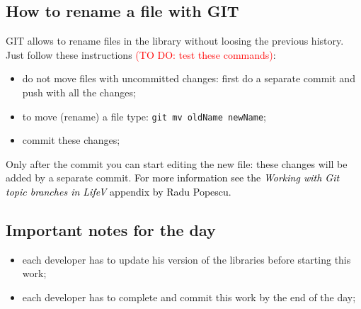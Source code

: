 \documentclass[10p]{article}
\newcommand{\todo}[1]{\textcolor{red}{#1}}
\newcommand{\newpartsVC}[1]{\textcolor{black}{#1}}
\theoremstyle{definition}
\begin{document}

\subsection*{How to rename a file with GIT}
GIT allows to rename files in the library without loosing the previous history. Just follow these instructions \todo{(TO DO: test these commands)}:
\begin{itemize}
  \item do not move files with uncommitted changes: first do a separate commit and push with all the changes;
  \item to move (rename) a file type: \texttt{git mv oldName newName};
  \item commit these changes;
\end{itemize}
Only after the commit you can start editing the new file: these changes will be added by a separate commit. \newpartsVC{For more information see the \emph{Working with Git topic branches in LifeV} appendix by Radu Popescu.}

\subsection*{Important notes for the day}
\begin{itemize}
  \item each developer has to update his version of the libraries before starting this work;
  \item each developer has to complete and commit this work by the end of the day;
\end{itemize}
\end{document}
